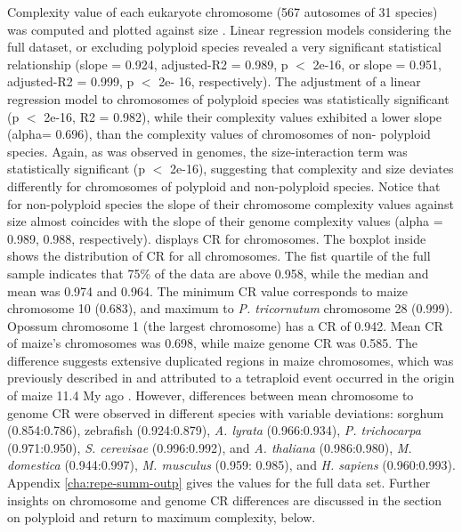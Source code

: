 Complexity value of each eukaryote chromosome (567 autosomes of 31 species) was computed and plotted against size . Linear regression models considering the full dataset, or excluding polyploid species revealed a very significant statistical relationship (slope = 0.924, adjusted-R2 = 0.989, p $<$ 2e-16, or slope = 0.951, adjusted-R2 = 0.999, p $<$ 2e- 16, respectively). The adjustment of a linear regression model to chromosomes of polyploid species was statistically significant (p $<$ 2e-16, R2 = 0.982), while their complexity values exhibited a lower slope (alpha= 0.696), than the complexity values of chromosomes of non- polyploid species. Again, as was observed in genomes, the size-interaction term was statistically significant (p $<$ 2e-16), suggesting that complexity and size deviates differently for chromosomes of polyploid and non-polyploid species. Notice that for non-polyploid species the slope of their chromosome complexity values against size almost coincides with the slope of their genome complexity values (alpha = 0.989, 0.988, respectively).  displays CR for chromosomes. The boxplot inside shows the distribution of CR for all chromosomes. The fist quartile of the full sample indicates that 75\% of the data are above 0.958, while the median and mean was 0.974 and 0.964. The minimum CR value corresponds to maize chromosome 10 (0.683), and maximum to \textit{P. tricornutum} chromosome 28 (0.999). Opossum chromosome 1 (the largest chromosome) has a CR of 0.942. Mean CR of maize's chromosomes was 0.698, while maize genome CR was 0.585. The difference suggests extensive duplicated regions in maize chromosomes, which was previously described in \cite{Weber1989,Gaut2001} and attributed to a tetraploid event occurred in the origin of maize 11.4 My ago \cite{Gaut1997,Wolfe2001}. However, differences between mean chromosome to genome CR were observed in different species with variable deviations: sorghum (0.854:0.786), zebrafish (0.924:0.879), \textit{A. lyrata} (0.966:0.934), \textit{P. trichocarpa} (0.971:0.950), \textit{S. cerevisae} (0.996:0.992), and \textit{A. thaliana} (0.986:0.980), \textit{M. domestica} (0.944:0.997), \textit{M. musculus} (0.959: 0.985), and \textit{H. sapiens} (0.960:0.993). Appendix \ref{cha:repe-summ-outp} gives the values for the full data set. Further insights on chromosome and genome CR differences are discussed in the section on polyploid and return to maximum complexity, below.

